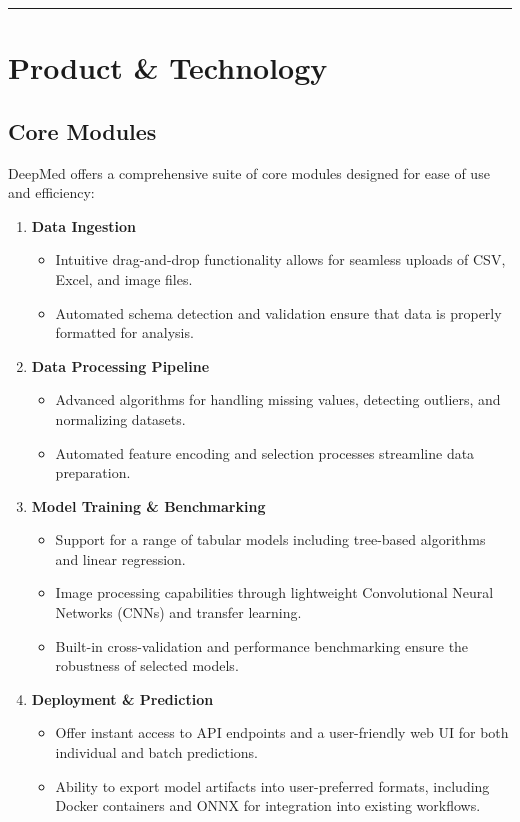 \documentclass[11pt,a4paper]{article}
\begin{document}
\bigskip\hrule\bigskip

\section{Product \& Technology}

\subsection{Core Modules}
DeepMed offers a comprehensive suite of core modules designed for ease of use and efficiency:
\begin{enumerate}
  \item \textbf{Data Ingestion}
    \begin{itemize}
      \item Intuitive drag-and-drop functionality allows for seamless uploads of CSV, Excel, and image files.
      \item Automated schema detection and validation ensure that data is properly formatted for analysis.
    \end{itemize}
  \item \textbf{Data Processing Pipeline}
    \begin{itemize}
      \item Advanced algorithms for handling missing values, detecting outliers, and normalizing datasets.
      \item Automated feature encoding and selection processes streamline data preparation.
    \end{itemize}
  \item \textbf{Model Training \& Benchmarking}
    \begin{itemize}
      \item Support for a range of tabular models including tree-based algorithms and linear regression.
      \item Image processing capabilities through lightweight Convolutional Neural Networks (CNNs) and transfer learning.
      \item Built-in cross-validation and performance benchmarking ensure the robustness of selected models.
    \end{itemize}
  \item \textbf{Deployment \& Prediction}
    \begin{itemize}
      \item Offer instant access to API endpoints and a user-friendly web UI for both individual and batch predictions.
      \item Ability to export model artifacts into user-preferred formats, including Docker containers and ONNX for integration into existing workflows.
    \end{itemize}
\end{enumerate}
\end{document}
